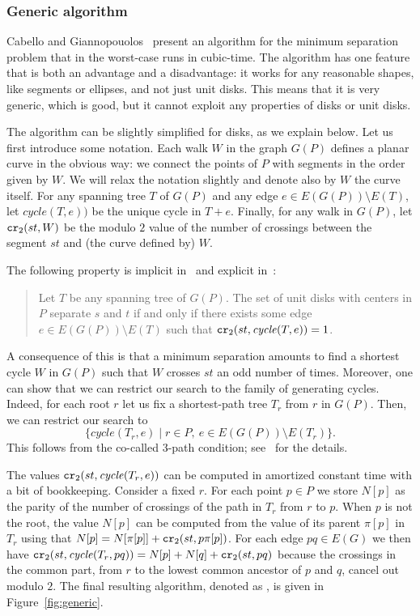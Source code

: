 \documentclass[a4paper,USenglish,numberwithinsect]{lipics}
\newcommand{\cycle}{\mathit{cycle}}
\newcommand\CR{\mbox{\tt cr}_2}		  %
\begin{document}
\subsubsection*{Generic algorithm}
Cabello and Giannopouolos~\cite{CG16} present an algorithm
for the minimum separation problem that in the worst-case runs in cubic-time.
The algorithm has one feature that is both an advantage and a disadvantage: 
it works for any reasonable shapes, like segments or ellipses, and not just unit disks.
This means that it is very generic, which is good,
but it cannot exploit any properties of disks or unit disks.

The algorithm can be slightly simplified for disks, as we explain below. 
Let us first introduce some notation.
Each walk $W$ in the graph $G(P)$ defines a planar curve
in the obvious way: we connect the points of $P$ 
with segments in the order given by $W$. 
We will relax the notation slightly and denote also by $W$ the curve itself.
For any spanning tree $T$ of $G(P)$ and any edge $e\in E(G(P))\setminus E(T)$, 
let $\cycle(T,e))$ be the unique cycle in $T+e$.
Finally, for any walk in $G(P)$, let $\CR (st,W)$ be the 
modulo $2$ value of the number of crossings between the segment $st$ 
and (the curve defined by) $W$.

The following property is implicit in~\cite{CG16} and explicit in~\cite{CK15}:
\begin{quote}
	Let $T$ be any spanning tree of $G(P)$.
	The set of unit disks with centers in $P$ separate $s$ and $t$ if and only
	if there exists some edge $e\in E(G(P))\setminus E(T)$ 
	such that $\CR (st, \cycle(T,e))=1$.
\end{quote}

A consequence of this is that a minimum separation amounts to find a shortest
cycle $W$ in $G(P)$ such that $W$ crosses $st$ an odd number of times.
Moreover, one can show that we can restrict our search to the family 
of generating cycles. Indeed, for each root $r$ let us fix a 
shortest-path tree $T_r$ from $r$ in $G(P)$.
Then, we can restrict our search to
\[
	\{ \cycle(T_r,e)\mid r\in P,~ e\in E(G(P))\setminus E(T_r)\}.
\]
This follows from the co-called 3-path condition; 
see~\cite{CG16} for the details.

The values $\CR (st, \cycle(T_r,e))$ can be computed in amortized constant time
with a bit of bookkeeping. Consider a fixed $r$.
For each point $p\in P$ we store $N[p]$ as the parity of the number of crossings
of the path in $T_r$ from $r$ to $p$. When $p$ is not the root,
the value $N[p]$ can be computed from the value of its parent $\pi[p]$ in $T_r$
using that $N[p]=N[\pi[p]]+\CR(st,p\pi[p])$.
For each edge $pq\in E(G)$ we
then have $\CR (st, \cycle(T_r,pq))= N[p]+N[q]+\CR(st,pq)$ because
the crossings in the common part, from $r$ to the lowest common ancestor of $p$ and $q$,
cancel out modulo $2$.
The final resulting algorithm, denoted as ,
is given in Figure~\ref{fig:generic}.
\end{document}
